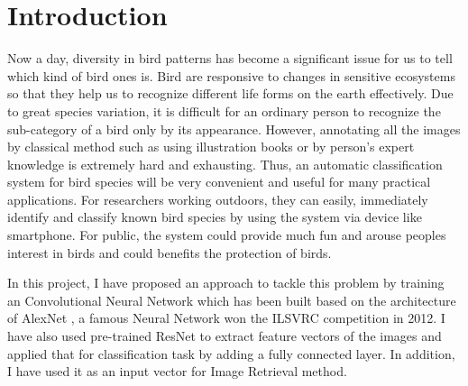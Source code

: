 \documentclass[runningheads]{llncs}
\begin{document}
\section{Introduction}
Now a day, diversity in bird patterns has become a significant issue for us to tell which kind of bird ones is. Bird are responsive to changes in sensitive ecosystems so that they help us to recognize different life forms on the earth effectively. Due to great species variation, it is difficult for an ordinary person to recognize the sub-category of a bird only by its appearance. However, annotating all the images by classical method such as using illustration books or by person's expert knowledge is extremely hard and exhausting. Thus, an automatic classification system for bird species will be very convenient and useful for many practical applications. For researchers working outdoors, they can easily, immediately identify and classify known bird species by using the system via device like smartphone. For public, the system could provide much fun and arouse peoples interest in birds and could benefits the protection of birds.
\par In this project, I have proposed an approach to tackle this problem by training an Convolutional Neural Network which has been built based on the architecture of AlexNet \autocite{alexnet}, a famous Neural Network won the ILSVRC competition in 2012. I have also used pre-trained ResNet \autocite{resnet} to extract feature vectors of the images and applied that for classification task by adding a fully connected layer. In addition, I have used it as an input vector for Image Retrieval method. 

\end{document}
